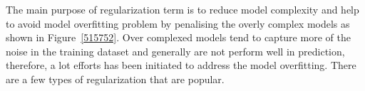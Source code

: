 
The main purpose of regularization term is to reduce model complexity and help to avoid model overfitting problem by penalising the overly complex models as shown in Figure~\ref{515752}. Over complexed models tend to capture more of the noise in the training dataset and generally are not perform well in prediction, therefore, a lot efforts has been initiated to address the model overfitting. There are a few types of regularization that are popular. 